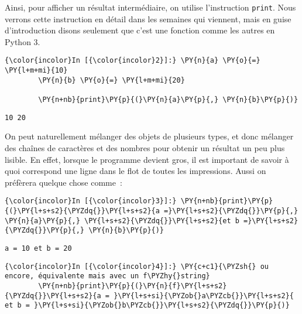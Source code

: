     Ainsi, pour afficher un résultat intermédiaire, on utilise l'instruction
\texttt{print}. Nous verrons cette instruction en détail dans les
semaines qui viennent, mais en guise d'introduction disons seulement que
c'est une fonction comme les autres en Python 3.

    \begin{Verbatim}[commandchars=\\\{\}]
{\color{incolor}In [{\color{incolor}2}]:} \PY{n}{a} \PY{o}{=} \PY{l+m+mi}{10}
        \PY{n}{b} \PY{o}{=} \PY{l+m+mi}{20}
        
        \PY{n+nb}{print}\PY{p}{(}\PY{n}{a}\PY{p}{,} \PY{n}{b}\PY{p}{)}
\end{Verbatim}


    \begin{Verbatim}[commandchars=\\\{\}]
10 20

    \end{Verbatim}

    On peut naturellement mélanger des objets de plusieurs types, et donc
mélanger des chaînes de caractères et des nombres pour obtenir un
résultat un peu plus lisible. En effet, lorsque le programme devient
gros, il est important de savoir à quoi correspond une ligne dans le
flot de toutes les impressions. Aussi on préfèrera quelque chose comme~:

    \begin{Verbatim}[commandchars=\\\{\}]
{\color{incolor}In [{\color{incolor}3}]:} \PY{n+nb}{print}\PY{p}{(}\PY{l+s+s2}{\PYZdq{}}\PY{l+s+s2}{a =}\PY{l+s+s2}{\PYZdq{}}\PY{p}{,} \PY{n}{a}\PY{p}{,} \PY{l+s+s2}{\PYZdq{}}\PY{l+s+s2}{et b =}\PY{l+s+s2}{\PYZdq{}}\PY{p}{,} \PY{n}{b}\PY{p}{)}
\end{Verbatim}


    \begin{Verbatim}[commandchars=\\\{\}]
a = 10 et b = 20

    \end{Verbatim}

    \begin{Verbatim}[commandchars=\\\{\}]
{\color{incolor}In [{\color{incolor}4}]:} \PY{c+c1}{\PYZsh{} ou encore, équivalente mais avec un f\PYZhy{}string}
        \PY{n+nb}{print}\PY{p}{(}\PY{n}{f}\PY{l+s+s2}{\PYZdq{}}\PY{l+s+s2}{a = }\PY{l+s+si}{\PYZob{}a\PYZcb{}}\PY{l+s+s2}{ et b = }\PY{l+s+si}{\PYZob{}b\PYZcb{}}\PY{l+s+s2}{\PYZdq{}}\PY{p}{)}
\end{Verbatim}


